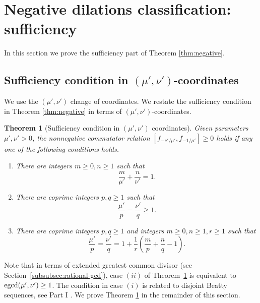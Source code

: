 \documentclass[11pt, letterpaper, reqno]{amsart}
\newtheorem{thm}{Theorem}[section]
\theoremstyle{definition}
\theoremstyle{remark}
\numberwithin{equation}{section}
\newcommand{\uu}{{\mu'}}
\newcommand{\vv}{{\nu'}}
\newcommand{\egcd}{{\rm egcd}}
\begin{document}
%
%
\section{Negative dilations classification: sufficiency}
\label{sec:negative-S}

In this section we prove the sufficiency part of Theorem \ref{thm:negative}.

%
%
\subsection{Sufficiency condition in $(\uu, \vv)$-coordinates}
\label{sec:neg-sufficient}
We use the $(\uu,\vv)$ change of coordinates.
We restate the sufficiency  condition in Theorem \ref{thm:negative} in terms of $(\uu,\vv)$-coordinates.


\begin{thm}[Sufficiency condition in $(\uu,\vv)$ coordinates]
\label{thm:neg-sufficient}
Given parameters $\uu,\vv>0$, 
 the nonnegative commutator relation $[f_{-\vv/\uu}, f_{-1/\uu}] \geq 0$  holds 
if any one of the following conditions holds.
\begin{enumerate}
\item[(i)] 
There are integers $m\geq 0,n\geq 1$ such that
  \begin{equation*}
  \frac{m}{\uu} + \frac{n}{\vv} = 1.
  \end{equation*}
\item[(ii)] 
  There are coprime integers $p,q\geq 1$ such that
  \begin{equation*}
  \frac{\uu}{p} = \frac{\vv}{q} \geq 1.
  \end{equation*}

\item[(iii*)]
There are coprime integers $p, q\geq 1$ and  integers $m\geq 0, n\geq 1, r\geq 1$ such that
  \begin{equation*}
  \frac{\uu}{p} = \frac{\vv}{q} = 1 +\frac{1}{r}\left(\frac{m}{p}+ \frac{n}{q} - 1 \right).
  \end{equation*}
\end{enumerate}
\end{thm}
Note that in terms of extended greatest common divisor (see Section~\ref{subsubsec:rational-gcd}),
case $(ii)$ of Theorem~\ref{thm:neg-sufficient} is equivalent to ${ \egcd(\uu,\vv) \geq 1 }$.
The condition in case $(i)$ is related to disjoint Beatty sequences, see Part I
\cite[Prop. 2.5]{LagR:2018a}.
We prove Theorem \ref{thm:neg-sufficient} in the remainder of this section.
\end{document}
